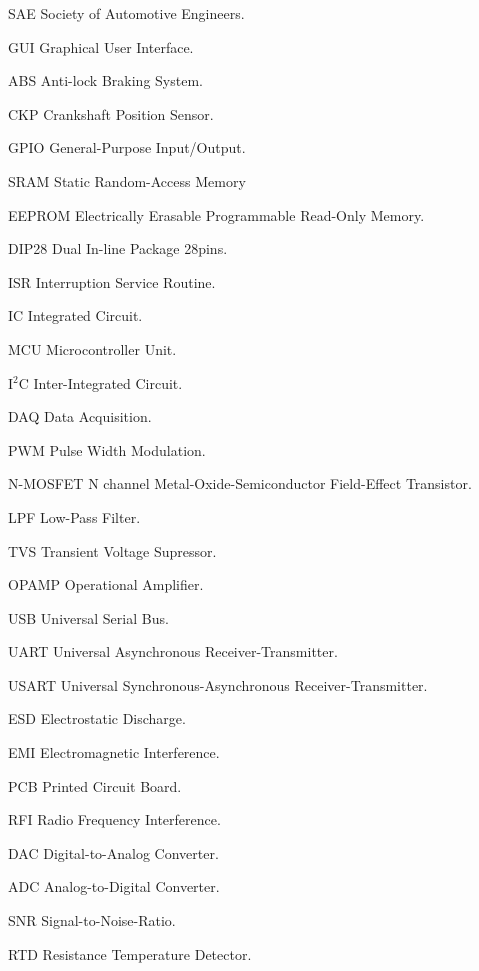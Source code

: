 \begin{siglas}
  \item[SAE] Society of Automotive Engineers.
  \item[GUI] Graphical User Interface.
  \item[ABS] Anti-lock Braking System.
  \item[CKP] Crankshaft Position Sensor.
  \item[GPIO] General-Purpose Input/Output.
  \item[SRAM] Static Random-Access Memory
  \item[EEPROM] Electrically Erasable Programmable Read-Only Memory.
  \item[DIP28] Dual In-line Package 28pins.
  \item[ISR] Interruption Service Routine.
  \item[IC] Integrated Circuit.
  \item[MCU] Microcontroller Unit.
  \item[I$^2$C] Inter-Integrated Circuit.
  \item[DAQ] Data Acquisition.
  \item[PWM] Pulse Width Modulation.
  \item[N-MOSFET] N channel Metal-Oxide-Semiconductor Field-Effect Transistor.
  \item[LPF] Low-Pass Filter.
  \item[TVS] Transient Voltage Supressor.
  \item[OPAMP] Operational Amplifier.
  \item[USB] Universal Serial Bus.
  \item[UART] Universal Asynchronous Receiver-Transmitter.
  \item[USART] Universal Synchronous-Asynchronous Receiver-Transmitter.
  \item[ESD] Electrostatic Discharge.
  \item[EMI] Electromagnetic Interference.
  \item[PCB] Printed Circuit Board.
  \item[RFI] Radio Frequency Interference.
  \item[DAC] Digital-to-Analog Converter.
  \item[ADC] Analog-to-Digital Converter.
  \item[SNR] Signal-to-Noise-Ratio.
  \item[RTD] Resistance Temperature Detector.
\end{siglas}
